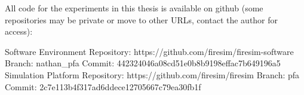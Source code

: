 All code for the experiments in this thesis is available on github (some
repositories may be private or move to other URLs, contact the author for
access):

\begin{outline}
  \1 Software Environment
    \2 Repository: https://github.com/firesim/firesim-software
    \2 Branch: nathan\_pfa
    \2 Commit: 442324046a08cd51e0b8b9198effac7b649196a5 
  \1 Simulation Platform
    \2 Repository: https://github.com/firesim/firesim
    \2 Branch: pfa
    \2 Commit: 2c7e113b4f317ad6ddece12705667c79ea30fb1f
\end{outline}
  
